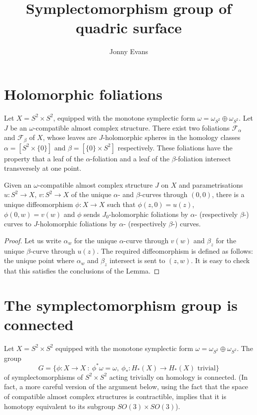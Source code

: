 \documentclass{article}
\title{Symplectomorphism group of quadric surface}
\author{Jonny Evans}
\begin{document}
\section{Holomorphic foliations}

\begin{Theorem}
  Let $X=S^2\times S^2$, equipped with the monotone symplectic form $\omega=\omega_{S^2}\oplus\omega_{S^2}$. Let $J$ be an $\omega$-compatible almost complex structure. There exist two foliations $\mathcal{F}_\alpha$ and $\mathcal{F}_\beta$ of $X$, whose leaves are $J$-holomorphic spheres in the homology classes $\alpha=[S^2\times\{0\}]$ and $\beta=[\{0\}\times S^2]$ respectively. These foliations have the property that a leaf of the $\alpha$-foliation and a leaf of the $\beta$-foliation intersect transversely at one point.
\end{Theorem}

\begin{Lemma}[lmadiffeo]
  Given an $\omega$-compatible almost complex structure $J$ on $X$ and parametrisations $u\colon S^2\to X$, $v\colon S^2\to X$ of the unique $\alpha$- and $\beta$-curves through $(0,0)$, there is a unique diffeomorphism $\phi\colon X\to X$ such that $\phi(z,0)=u(z)$, $\phi(0,w)=v(w)$ and $\phi$ sends $J_0$-holomorphic foliations by $\alpha$- (respectively $\beta$-) curves to $J$-holomorphic foliations by $\alpha$- (respectively $\beta$-) curves.
\end{Lemma}
\begin{proof}
  Let us write $\alpha_w$ for the unique $\alpha$-curve through $v(w)$ and $\beta_z$ for the unique $\beta$-curve through $u(z)$. The required diffeomorphism is defined as follows: the unique point where $\alpha_w$ and $\beta_z$ intersect is sent to $(z,w)$. It is easy to check that this satisfies the conclusions of the Lemma.
\end{proof}

\section{The symplectomorphism group is connected}

\begin{Theorem}[thmgromovquadric]
  Let $X=S^2\times S^2$ equipped with the monotone symplectic form $\omega=\omega_{S^2}\oplus\omega_{S^2}$. The group
  \[G=\{\phi\colon X\to X\ :\ \phi^*\omega=\omega,\ \phi_*\colon H_*(X)\to H_*(X)\mbox{ trivial}\}\]
  of symplectomorphisms of $S^2\times S^2$ acting trivially on homology is connected. (In fact, a more careful version of the argument below, using the fact that the space of compatible almost complex structures is contractible, implies that it is homotopy equivalent to its subgroup $SO(3)\times SO(3)$).
\end{Theorem}
\end{document}
